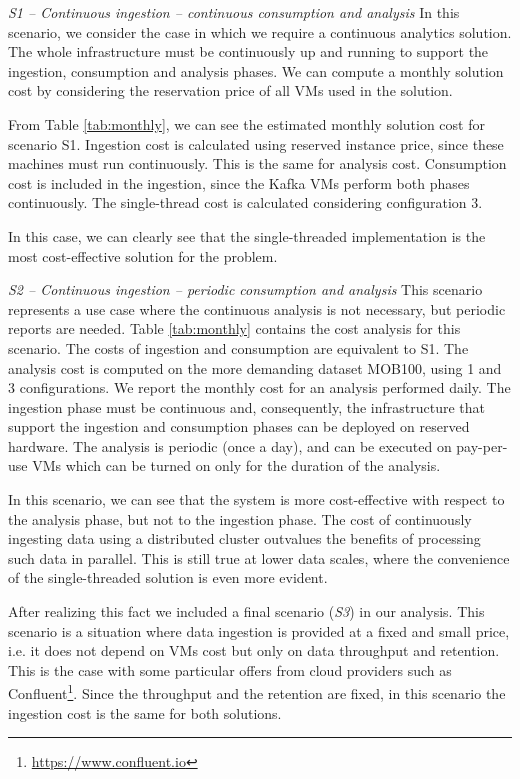 {\medskip

\textit{S1 -- Continuous ingestion -- continuous consumption and analysis}
In this scenario, we consider the case in which we require a continuous analytics solution. The whole infrastructure must be continuously up and running to support the ingestion, consumption and analysis phases. We can compute a monthly solution cost by considering the reservation price of all VMs used in the solution. 

From Table \ref{tab:monthly}, we can see the estimated monthly solution cost for scenario S1. Ingestion cost is calculated using reserved instance price, since these machines must run continuously. This is the same for analysis cost. Consumption cost is included in the ingestion, since the Kafka VMs perform both phases continuously. The single-thread cost is calculated considering configuration \sti{}3. 

In this case, we can clearly see that the single-threaded implementation is the most cost-effective solution for the problem.

\medskip

\textit{S2 -- Continuous ingestion -- periodic consumption and analysis}
This scenario represents a use case where the continuous analysis is not necessary, but periodic reports are needed. Table \ref{tab:monthly} contains the cost analysis for this scenario. The costs of ingestion and consumption are equivalent to S1. The analysis cost is computed on the more demanding dataset MOB100, using \sparkdi{}1 and \sti{}3 configurations. We report the monthly cost for an analysis performed daily. The ingestion phase must be continuous and, consequently, the infrastructure that support the ingestion and consumption phases can be deployed on reserved hardware. The analysis is periodic (once a day), and can be executed on pay-per-use VMs which can be turned on only for the duration of the analysis. 

In this scenario, we can see that the \sparkdi{} system is more cost-effective with respect to the analysis phase, but not to the ingestion phase. The cost of continuously ingesting data using a distributed cluster outvalues the benefits of processing such data in parallel. This is still true at lower data scales, where the convenience of the single-threaded solution is even more evident.

After realizing this fact we included a final scenario (\textit{S3}) in our analysis. This scenario is a situation where data ingestion is provided at a fixed and small price, i.e. it does not depend on VMs cost but only on data throughput and retention. This is the case with some particular offers from cloud providers such as Confluent\footnote{\url{https://www.confluent.io}}. Since the throughput and the retention are fixed, in this scenario the ingestion cost is the same for both solutions.

}
